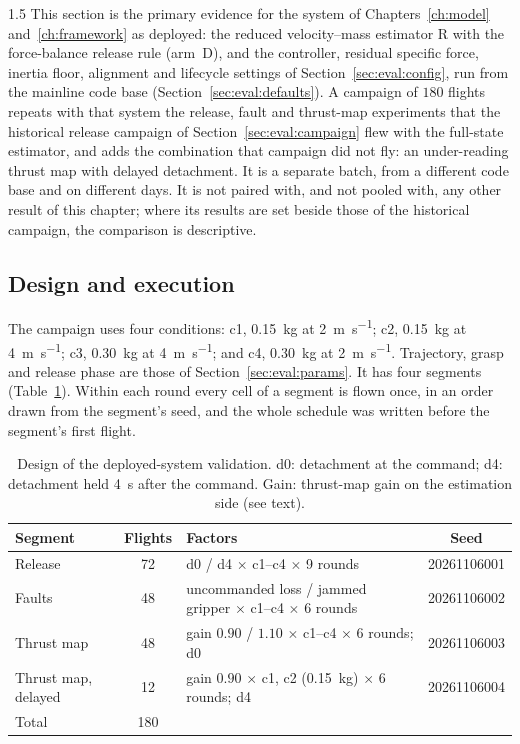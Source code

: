 \begin{spacing}{1.5}
This section is the primary evidence for the system of
Chapters~\ref{ch:model} and~\ref{ch:framework} as deployed: the reduced
velocity--mass estimator R with the force-balance release rule (arm~D), and the
controller, residual specific force, inertia floor, alignment and lifecycle
settings of Section~\ref{sec:eval:config}, run from the mainline code base
(Section~\ref{sec:eval:defaults}). A campaign of $180$ flights repeats with
that system the release, fault and thrust-map experiments that the historical
release campaign of Section~\ref{sec:eval:campaign} flew with the full-state
estimator, and adds the combination that campaign did not fly: an
under-reading thrust map with delayed detachment. It is a separate batch, from a
different code base and on different days. It is not paired with, and not pooled
with, any other result of this chapter; where its results are set beside those
of the historical campaign, the comparison is descriptive.

\subsection{Design and execution}\label{sec:eval:dep:design}

The campaign uses four conditions: c1, \SI{0.15}{\kg} at
\SI{2}{\meter\per\second}; c2, \SI{0.15}{\kg} at \SI{4}{\meter\per\second};
c3, \SI{0.30}{\kg} at \SI{4}{\meter\per\second}; and c4, \SI{0.30}{\kg} at
\SI{2}{\meter\per\second}. Trajectory, grasp and release phase are those of
Section~\ref{sec:eval:params}. It has four segments
(Table~\ref{tab:dep-design}). Within each round every cell of a segment is flown
once, in an order drawn from the segment's seed, and the whole schedule was
written before the segment's first flight.

\begin{table}[ht]
\centering
\caption[Design of the deployed-system validation]{Design of the
deployed-system validation. d0: detachment at the command; d4: detachment held
\SI{4}{\second} after the command. Gain: thrust-map gain on the estimation
side (see text).}
\label{tab:dep-design}
\small
\begin{tabularx}{\textwidth}{@{}l c >{\raggedright\arraybackslash}X c@{}}
\toprule
\textbf{Segment} & \textbf{Flights} & \textbf{Factors} & \textbf{Seed} \\
\midrule
Release & 72 & d0 / d4 $\times$ c1--c4 $\times$ 9 rounds & 20261106001 \\
Faults & 48 & uncommanded loss / jammed gripper $\times$ c1--c4 $\times$ 6 rounds & 20261106002 \\
Thrust map & 48 & gain $0.90$ / $1.10$ $\times$ c1--c4 $\times$ 6 rounds; d0 & 20261106003 \\
Thrust map, delayed & 12 & gain $0.90$ $\times$ c1, c2 (\SI{0.15}{\kg}) $\times$ 6 rounds; d4 & 20261106004 \\
\midrule
Total & 180 & & \\
\bottomrule
\end{tabularx}
\end{table}


\end{spacing}
